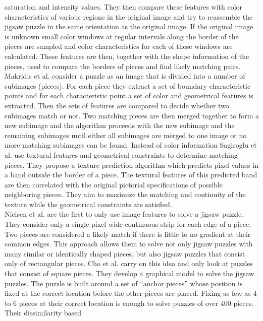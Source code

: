 \documentclass[]{report}
\begin{document}
saturation and intensity values. They then compare these features with color
characteristics of various regions in the original image and try to reassemble
the jigsaw puzzle in the same orientation as the original image. If the
original image is unknown small color windows at regular intervals along the
border of the pieces are sampled and color characteristics for each of these
windows are calculated. These features are then, together with the shape
information of the pieces, used to compare the borders of pieces and find likely
matching pairs. Makridis et al. \cite{makridis2006new} consider a puzzle as an
image that is divided into a number of subimages (pieces). For each piece they
extract a set of boundary characteristic points and for each characteristic
point a set of color and geometrical features is extracted. Then the sets of
features are compared to decide whether two subimages match or not. Two matching
pieces are then merged together to form a new subimage and the algorithm
proceeds with the new subimage and the remaining subimages until either all
subimages are merged to one image or no more matching subimages can be found.
Instead of color information Sagiroglu et al. \cite{sagiroglu2006texture} use
textural features and geometrical constraints to determine matching pieces. They
propose a texture prediction algorithm which predicts pixel values in a band
outside the border of a piece. The textural features of this predicted band are
then correlated with the original pictorial specifications of possible
neighboring pieces. They aim to maximize the matching and continuity of the
texture while the geometrical constraints are satisfied. \\
Nielsen et al. \cite{nielsen2008solving} are the first to only use image
features to solve a jigsaw puzzle. They consider only a single-pixel wide
continuous strip for each edge of a piece. Two pieces are considered a likely
match if there is little to no gradient at their common edges. This approach
allows them to solve not only jigsaw puzzles with many similar or identically shaped
pieces, but also jigsaw puzzles that consist only of rectangular pieces. Cho et
al. \cite{Cho2010} carry on this idea and only look at puzzles that consist of
square pieces. They develop a graphical model to solve the jigsaw puzzles. The
puzzle is built around a set of ``anchor pieces'' whose position is fixed at the
correct location before the other pieces are placed. Fixing
as few as 4 to 6 pieces at their correct location is enough to solve puzzles of
over 400 pieces. Their dissimilarity based
\end{document}
